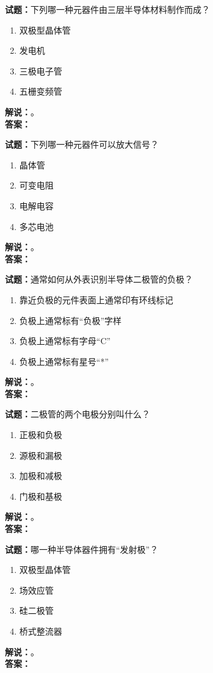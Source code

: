 \documentclass{ctexbook}
\begin{document}
\bigskip

\noindent\textbf{试题：}下列哪一种元器件由三层半导体材料制作而成？
\begin{enumerate}[leftmargin=3em]
  \item 双极型晶体管
  \item 发电机
  \item 三极电子管
  \item 五栅变频管
\end{enumerate}
\noindent\textbf{解说：}\textbf{}。\\\noindent\textbf{答案：}

\bigskip

\noindent\textbf{试题：}下列哪一种元器件可以放大信号？
\begin{enumerate}[leftmargin=3em]
  \item 晶体管
  \item 可变电阻
  \item 电解电容
  \item 多芯电池
\end{enumerate}
\noindent\textbf{解说：}\textbf{}。\\\noindent\textbf{答案：}

\bigskip

\noindent\textbf{试题：}通常如何从外表识别半导体二极管的负极？
\begin{enumerate}[leftmargin=3em]
  \item 靠近负极的元件表面上通常印有环线标记
  \item 负极上通常标有“负极”字样
  \item 负极上通常标有字母“C”
  \item 负极上通常标有星号“*”
\end{enumerate}
\noindent\textbf{解说：}\textbf{}。\\\noindent\textbf{答案：}

\bigskip

\noindent\textbf{试题：}二极管的两个电极分别叫什么？
\begin{enumerate}[leftmargin=3em]
  \item 正极和负极
  \item 源极和漏极
  \item 加极和减极
  \item 门极和基极
\end{enumerate}
\noindent\textbf{解说：}\textbf{}。\\\noindent\textbf{答案：}

\bigskip

\noindent\textbf{试题：}哪一种半导体器件拥有“发射极”？
\begin{enumerate}[leftmargin=3em]
  \item 双极型晶体管
  \item 场效应管
  \item 硅二极管
  \item 桥式整流器
\end{enumerate}
\noindent\textbf{解说：}\textbf{}。\\\noindent\textbf{答案：}
\end{document}
